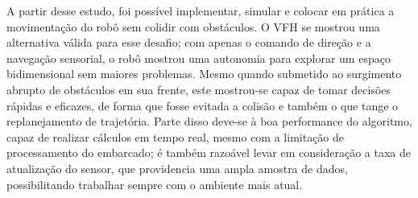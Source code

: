 A partir desse estudo, foi possível implementar, simular e colocar 
em prática a movimentação do robô sem colidir com obstáculos. O VFH
se mostrou uma alternativa válida para esse desafio; com apenas o 
comando de direção e a navegação sensorial, o robô mostrou uma autonomia
para explorar um espaço bidimensional sem maiores problemas. Mesmo quando
submetido ao surgimento abrupto de obstáculos em sua frente, este mostrou-se
capaz de tomar decisões rápidas e eficazes, de forma que fosse evitada a
colisão e também o que tange o replanejamento de trajetória. Parte disso deve-se à
boa performance do algoritmo, capaz de realizar cálculos em tempo real, mesmo
com a limitação de processamento do embarcado; é também razoável levar em
consideração a taxa de atualização do sensor, que providencia uma ampla 
amostra de dados, possibilitando trabalhar sempre com o ambiente mais atual.
